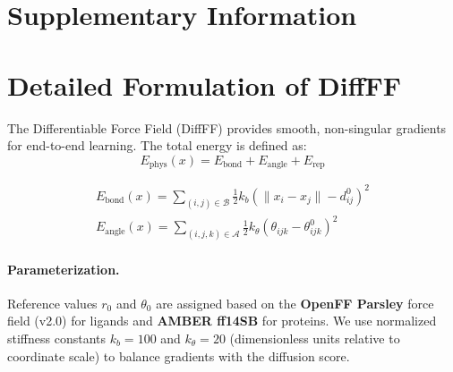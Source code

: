 \documentclass[twocolumn,10pt]{article}
\begin{document}
\newpage
\clearpage
\onecolumn
\begin{appendices}

\section*{Supplementary Information}

\setcounter{figure}{0}
\setcounter{table}{0}
\setcounter{section}{0}
\renewcommand{\figurename}{Supplementary Fig.}
\renewcommand{\tablename}{Supplementary Table}
\renewcommand{\thesection}{Supplementary Note \arabic{section}}

\section{Detailed Formulation of DiffFF}\label{secA1}

The Differentiable Force Field (DiffFF) provides smooth, non-singular gradients for end-to-end learning. The total energy is defined as:
\begin{equation}
    E_{\mathrm{phys}}(x) = E_{\mathrm{bond}} + E_{\mathrm{angle}} + E_{\mathrm{rep}}
\end{equation}

\begin{gather}
    E_{\text{bond}}(x) = \sum_{(i,j) \in \mathcal{B}} \tfrac{1}{2} k_b \left(\|x_i - x_j\| - d_{ij}^0\right)^2 \\
    E_{\text{angle}}(x) = \sum_{(i,j,k) \in \mathcal{A}} \tfrac{1}{2} k_\theta (\theta_{ijk} - \theta_{ijk}^0)^2
\end{gather}
\paragraph{Parameterization.}
Reference values $r_{0}$ and $\theta_{0}$ are assigned based on the \textbf{OpenFF Parsley} force field (v2.0) for ligands and \textbf{AMBER ff14SB} for proteins. We use normalized stiffness constants $k_b = 100$ and $k_\theta = 20$ (dimensionless units relative to coordinate scale) to balance gradients with the diffusion score.


\end{appendices}
\end{document}
